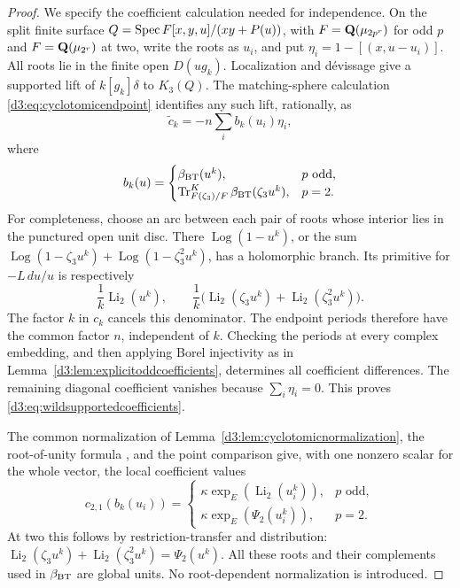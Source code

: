 \begin{proof}
We specify the coefficient calculation needed for independence.
On the split finite surface
$Q=\operatorname{Spec} F[x,y,u]/(xy+P(u))$, with $F=\mathbf Q(\mu_{2p^r})$ for
odd $p$ and $F=\mathbf Q(\mu_{2^r})$ at two, write the roots as $u_i$,
and put $\eta_i=1-[(x,u-u_i)]$.
All roots lie in the finite open $D(ug_k)$.
Localization and d\'evissage give a supported lift of
$k[g_k]\delta$ to $K_3(Q)$.
The matching-sphere calculation \eqref{d3:eq:cyclotomicendpoint}
identifies any such lift, rationally, as
\begin{equation}\label{d3:eq:wildsupportedcoefficients}
 \widetilde c_k=-n\sum_i b_k(u_i)\eta_i,
\end{equation}
where
\[
 b_k(u)=
 \begin{cases}
 \beta_{\rm BT}(u^k),&p\text{ odd},\\
 \operatorname{Tr}^{K}_{F(\zeta_3)/F}
       \beta_{\rm BT}(\zeta_3u^k),&p=2.
 \end{cases}
\]
For completeness, choose an arc between each pair of roots whose
interior lies in the punctured open unit disc. There
$\operatorname{Log}(1-u^k)$, or the sum
$\operatorname{Log}(1-\zeta_3u^k)+
 \operatorname{Log}(1-\zeta_3^2u^k)$, has a holomorphic branch.
Its primitive for $-L\,du/u$ is respectively
\[
 \frac1k\operatorname{Li}_2(u^k),\qquad
 \frac1k\bigl(\operatorname{Li}_2(\zeta_3u^k)
                  +\operatorname{Li}_2(\zeta_3^2u^k)\bigr).
\]
The factor $k$ in $c_k$ cancels this denominator.
The endpoint periods therefore have the common factor $n$,
independent of $k$. Checking the periods at every complex embedding,
and then applying Borel injectivity as in
Lemma~\ref{d3:lem:explicitoddcoefficients}, determines all coefficient
differences. The remaining diagonal coefficient vanishes because
$\sum_i\eta_i=0$. This proves
\eqref{d3:eq:wildsupportedcoefficients}.

The common normalization of
Lemma~\ref{d3:lem:cyclotomicnormalization}, the root-of-unity formula
\cite[Theorem~1.12]{BesserDeJeu}, and the point comparison give,
with one nonzero scalar for the whole vector, the local coefficient
values
\[
 c_{2,1}(b_k(u_i))=
 \begin{cases}
 \kappa\exp_E(\operatorname{Li}_2(u_i^k)),&p\text{ odd},\\
 \kappa\exp_E(\Psi_2(u_i^k)),&p=2.
 \end{cases}
\]
At two this follows by restriction-transfer and distribution:
$\operatorname{Li}_2(\zeta_3u^k)+
\operatorname{Li}_2(\zeta_3^2u^k)=\Psi_2(u^k)$.
All these roots and their complements used in $\beta_{\rm BT}$
are global units. No root-dependent normalization is introduced.


\end{proof}
